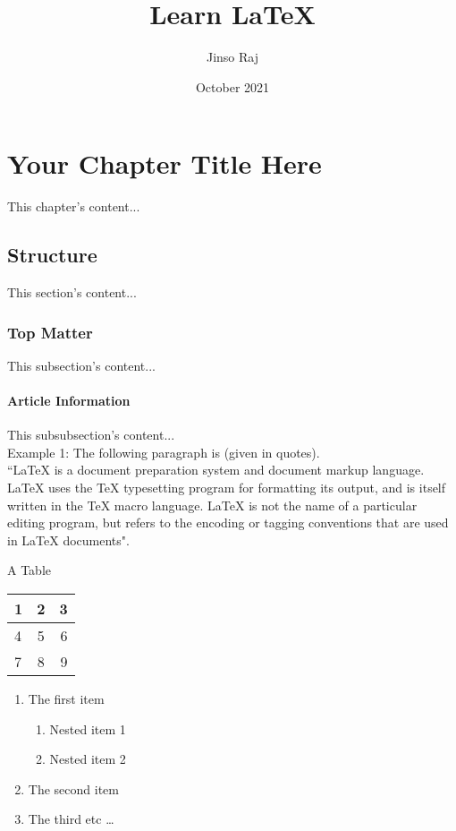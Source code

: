 \documentclass{report}
\begin{document}
    \title{Learn \LaTeX}
    \author{Jinso Raj}
    \date{October 2021}
    \maketitle

    \chapter{Your Chapter Title Here}
    This chapter's content...

    \section{Structure}
    This section's content...

    \subsection{Top Matter}
    This subsection's content...

    \subsubsection{Article Information}
    This subsubsection's content... \\


    
    Example 1: The following paragraph is (given in quotes). \\

    ``LaTeX is a document preparation system and document markup 
    language. LaTeX uses the TeX typesetting program for formatting 
    its output, and is itself written in the TeX macro language. 
    LaTeX is not the name of a particular editing program, but 
    refers to the encoding or tagging conventions that are used 
    in LaTeX documents".
    
    \begin{center}
        A Table 
    \end{center}

    \begin{center}
        \begin{tabular}{ | l | c | r |}
            \hline
            1 & 2 & 3 \\ \hline
            4 & 5 & 6 \\ \hline
            7 & 8 & 9 \\
            \hline
        \end{tabular}
    \end{center}

    \begin{enumerate}
        \item The first item
        \begin{enumerate}
            \item Nested item 1
            \item Nested item 2
        \end{enumerate}
        \item The second item
        \item The third etc \ldots
    \end{enumerate}
        
\end{document}
